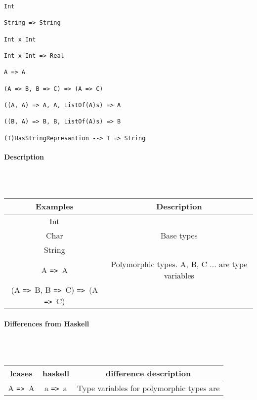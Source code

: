 \documentclass{article}
\def\ra{\texttt{=>}\ }
\def\pend{\mbox{} \\\\}
\begin{document}
\begin{verbatim}
Int

String => String 

Int x Int 

Int x Int => Real

A => A

(A => B, B => C) => (A => C)

((A, A) => A, A, ListOf(A)s) => A

((B, A) => B, B, ListOf(A)s) => B

(T)HasStringRepresantion --> T => String
\end{verbatim}

\paragraph{Description}\pend
\begin{tabular}{ |c|c| } 
\hline
Examples & Description \\ 
\hline
\hline
Int & \\
Char & Base types \\
String & \\ 
\hline
A \ra A &
Polymorphic types. A, B, C ... are type variables
\\
(A \ra B, B \ra C) \ra (A \ra C) &
\\ 
\hline
\end{tabular}

\paragraph{Differences from Haskell}\pend
\begin{tabular}{ |c|c|c| } 
\hline
lcases & haskell & difference description \\ 
\hline
\hline
A \ra A & a \ra a & Type variables for polymorphic types are  \\ 
\hline
\end{tabular}
\end{document}
